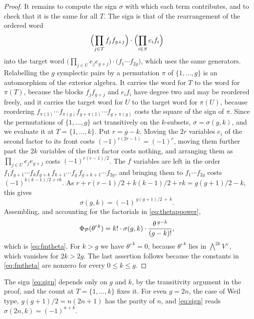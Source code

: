 \begin{proof}
It remains to compute the sign $\sigma$ with which each term contributes, and
to check that it is the same for all $T$. The sign is that of the
rearrangement of the ordered word
\[
  \Bigl(\prod_{j\in T}f_{j}f_{g+j}\Bigr)\cdot\Bigl(\prod_{i\in S}e_{i}f_{i}\Bigr)
\]
into the target word
$\bigl(\prod_{j\in U}e_{j}e_{g+j}\bigr)\cdot\bigl(f_{1}\cdots f_{2g}\bigr)$,
which uses the same generators. Relabelling the $g$ symplectic pairs by a
permutation $\pi$ of $\{1,\dots,g\}$ is an automorphism of the exterior
algebra. It
carries the word for $T$ to the word for $\pi(T)$, because the blocks
$f_{j}f_{g+j}$ and $e_{i}f_{i}$ have degree two and may be reordered freely,
and it carries the target word for $U$ to the target word for $\pi(U)$,
because reordering
$f_{\pi(1)}\cdots f_{\pi(g)}f_{g+\pi(1)}\cdots f_{g+\pi(g)}$ costs the
square of the sign of $\pi$. Since the permutations of $\{1,\dots,g\}$ act
transitively on the $k$-subsets, $\sigma=\sigma(g,k)$, and we evaluate it at
$T=\{1,\dots,k\}$. Put $r=g-k$. Moving the $2r$ variables $e_{i}$ of the
second factor to its front costs $(-1)^{r(2r-1)}=(-1)^{r}$, moving them
further past the $2k$ variables of the first factor costs nothing, and
arranging them as $\prod_{j\in U}e_{j}e_{g+j}$ costs $(-1)^{r(r-1)/2}$. The
$f$ variables are left in the order
$f_{1}f_{g+1}\cdots f_{k}f_{g+k}\,f_{k+1}\cdots f_{g}\,f_{g+k+1}\cdots f_{2g}$,
and bringing them to $f_{1}\cdots f_{2g}$ costs $(-1)^{k(k-1)/2+rk}$. As
$r+r(r-1)/2+k(k-1)/2+rk=g(g+1)/2-k$, this gives
\begin{equation}\label{eq:sign}
  \sigma(g,k)=(-1)^{\,g(g+1)/2\,+\,k}.
\end{equation}
Assembling, and accounting for the factorials in \eqref{eq:thetappower},
\[
  \Phi_{\mathcal{P}}(\theta'^{\,k})
  =k!\cdot\sigma(g,k)\cdot\frac{\theta^{\,g-k}}{(g-k)!},
\]
which is \eqref{eq:fmtheta}. For $k>g$ we have $\theta'^{\,k}=0$, because
$\theta'^{\,k}$ lies in $\bigwedge^{2k}V^{\vee}$, which vanishes for
$2k>2g$. The last assertion follows because the constants in
\eqref{eq:fmtheta} are nonzero for every $0\le k\le g$.
\end{proof}

\begin{remark}\label{rem:signcheck}
The sign \eqref{eq:sign} depends only on $g$ and $k$, by the transitivity
argument in the proof, and the count at $T=\{1,\dots,k\}$ fixes it. For even $g=2n$, the case of Weil type,
$g(g+1)/2=n(2n+1)$ has the parity of $n$, and \eqref{eq:sign} reads
$\sigma(2n,k)=(-1)^{n+k}$.
\end{remark}

